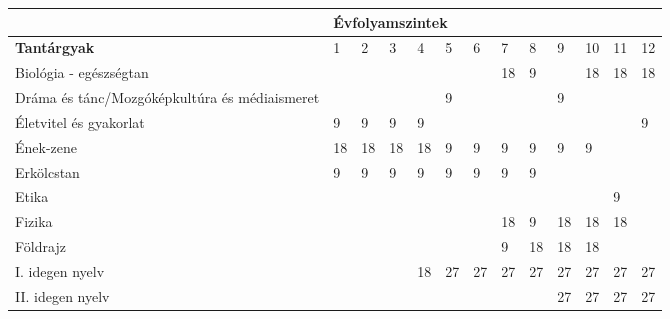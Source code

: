 \begin{landscape}
\begin{table}[]
  \begin{tabular}{l|l|l|l|l|l|l|l|l|l|l|l|l}
  
                                                        & \multicolumn{12}{l}{\textbf{Évfolyamszintek}}                                                                                                                                                           \\ \hline
    \textbf{Tantárgyak}                                          & 1                                     & 2           & 3           & 4           & 5           & 6           & 7           & 8           & 9           & 10          & 11          & 12          \\ \hline
    Biológia - egészségtan                              &     &     &     &     &     &     & 18  & 9   &     & 18  & 18  & 18  \\\hline
    Dráma és tánc/Mozgóképkultúra és médiaismeret       &     &     &     &     & 9   &     &     &     & 9   &     &     &     \\ \hline
    Életvitel és gyakorlat                              & 9   & 9   & 9   & 9   &     &     &     &     &     &     &     & 9   \\\hline
    Ének-zene                                           & 18  & 18  & 18  & 18  & 9   & 9   & 9   & 9   & 9   & 9   &     &     \\\hline
    Erkölcstan                                          & 9   & 9   & 9   & 9   & 9   & 9   & 9   & 9   &     &     &     &     \\\hline
    Etika                                               &     &     &     &     &     &     &     &     &     &     & 9   &     \\\hline
    Fizika                                              &     &     &     &     &     &     & 18  & 9   & 18  & 18  & 18  &     \\\hline
    Földrajz                                            &     &     &     &     &     &     & 9   & 18  & 18  & 18  &     &     \\\hline
    I. idegen nyelv                                     &     &     &     & 18  & 27  & 27  & 27  & 27  & 27  & 27  & 27  & 27  \\\hline
    II. idegen nyelv                                    &     &     &     &     &     &     &     &     & 27  & 27  & 27  & 27  \\\hline

\end{tabular}
\end{table}
\end{landscape}

